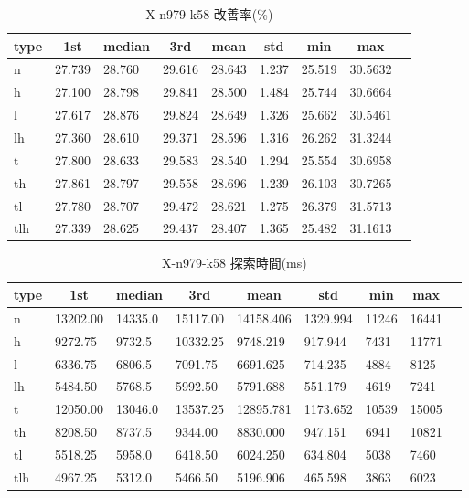 \begin{table}[htbp]
    \caption{X-n979-k58 改善率(\%)}
    \begin{tabular}{|l|l|l|l|l|l|l|l|l|}\hline
    \multicolumn{1}{|c|}{\textbf{type}}
    &\multicolumn{1}{|c|}{\textbf{1st}}
    &\multicolumn{1}{c|}{\textbf{median}}
    &\multicolumn{1}{c|}{\textbf{3rd}}
    &\multicolumn{1}{c|}{\textbf{mean}}
    &\multicolumn{1}{c|}{\textbf{std}}
    &\multicolumn{1}{c|}{\textbf{min}}
    &\multicolumn{1}{c|}{\textbf{max}}\\\hline
	n & 27.739 & 28.760 & 29.616 & 28.643 & 1.237 & 25.519 & 30.5632\\\hline
	h & 27.100 & 28.798 & 29.841 & 28.500 & 1.484 & 25.744 & 30.6664\\\hline
	l & 27.617 & 28.876 & 29.824 & 28.649 & 1.326 & 25.662 & 30.5461\\\hline
	lh & 27.360 & 28.610 & 29.371 & 28.596 & 1.316 & 26.262 & 31.3244\\\hline
	t & 27.800 & 28.633 & 29.583 & 28.540 & 1.294 & 25.554 & 30.6958\\\hline
	th & 27.861 & 28.797 & 29.558 & 28.696 & 1.239 & 26.103 & 30.7265\\\hline
	tl & 27.780 & 28.707 & 29.472 & 28.621 & 1.275 & 26.379 & 31.5713\\\hline
	tlh & 27.339 & 28.625 & 29.437 & 28.407 & 1.365 & 25.482 & 31.1613\\\hline
	\end{tabular}
\end{table}
\begin{table}[htbp]
    \caption{X-n979-k58 探索時間(ms)}
    \begin{tabular}{|l|l|l|l|l|l|l|l|l|}\hline
    \multicolumn{1}{|c|}{\textbf{type}}
    &\multicolumn{1}{|c|}{\textbf{1st}}
    &\multicolumn{1}{c|}{\textbf{median}}
    &\multicolumn{1}{c|}{\textbf{3rd}}
    &\multicolumn{1}{c|}{\textbf{mean}}
    &\multicolumn{1}{c|}{\textbf{std}}
    &\multicolumn{1}{c|}{\textbf{min}}
    &\multicolumn{1}{c|}{\textbf{max}}\\\hline
	n & 13202.00 & 14335.0 & 15117.00 & 14158.406 & 1329.994 & 11246 & 16441\\\hline
	h & 9272.75 & 9732.5 & 10332.25 & 9748.219 & 917.944 & 7431 & 11771\\\hline
	l & 6336.75 & 6806.5 & 7091.75 & 6691.625 & 714.235 & 4884 & 8125\\\hline
	lh & 5484.50 & 5768.5 & 5992.50 & 5791.688 & 551.179 & 4619 & 7241\\\hline
	t & 12050.00 & 13046.0 & 13537.25 & 12895.781 & 1173.652 & 10539 & 15005\\\hline
	th & 8208.50 & 8737.5 & 9344.00 & 8830.000 & 947.151 & 6941 & 10821\\\hline
	tl & 5518.25 & 5958.0 & 6418.50 & 6024.250 & 634.804 & 5038 & 7460\\\hline
	tlh & 4967.25 & 5312.0 & 5466.50 & 5196.906 & 465.598 & 3863 & 6023\\\hline
	\end{tabular}
\end{table}

